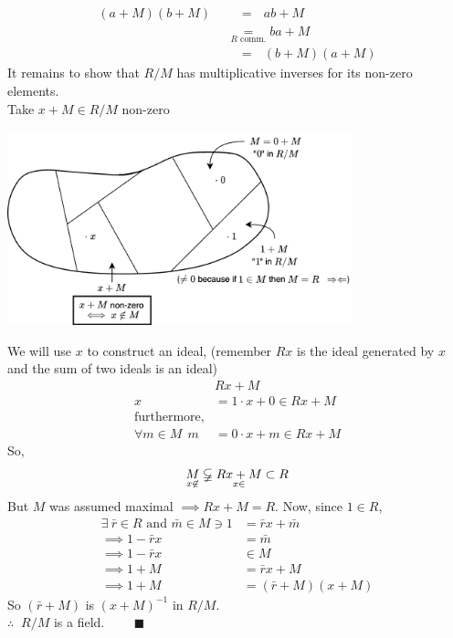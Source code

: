 \begin{theorem}
    \begin{align}
        (a+M)(b+M) \ \ & \ \ \ \ = \ \ \ ab+M \nonumber\\
        &\underset{R \text{ comm.}}{=}ba+M \nonumber \\
        & \ \ \ \ = \ \ \ (b+M)(a+M) \nonumber
    \end{align}
    It remains to show that $R/M$ has multiplicative inverses for its non-zero elements. \\ \steezybreak
    \noindent Take $x+M \in R/M$ non-zero
    \begin{center}
        \includegraphics[width=0.75\textwidth]{Figures/M_maximal_idk.png}
    \end{center}
    We will use $x$ to construct an ideal, (remember $Rx$ is the ideal generated by $x$ and the sum of two ideals is an ideal)
    \begin{align}
        &Rx+M \nonumber \\
        x&= 1\cdot x + 0 \in Rx + M \nonumber\\
    \text{furthermore,}& \nonumber \\
        \forall m \in M \ \ m &= 0\cdot x + m \in Rx+M \nonumber
    \end{align}
    So,
    \begin{align}
        \underset{x\not\in}{M} \varsubsetneqq \underset{x\in}{Rx+M} \subset R \nonumber
    \end{align}
    But $M$ was assumed maximal $\implies Rx+M = R$. Now, since $1\in R$,
    \begin{align}
        \exists \ \bar{r} \in R \text{ and } \bar{m}\in M \ni 1&=\bar{r}x+\bar{m} \nonumber \\
        \implies 1-\bar{r}x &= \bar{m} \nonumber \\
        \implies 1-\bar{r}x &\in M \nonumber \\
        \implies 1+M &= \bar{r}x+M \nonumber \\
        \implies 1+M &= (\bar{r}+M)(x+M) \nonumber 
    \end{align}
    So $(\bar{r}+M)$ is $(x+M)^{-1}$ in $R/M$. \\
    $\therefore$ $\ R/M$ is a field. \ \ \ \ $\blacksquare$
\end{theorem}
\newpage 
